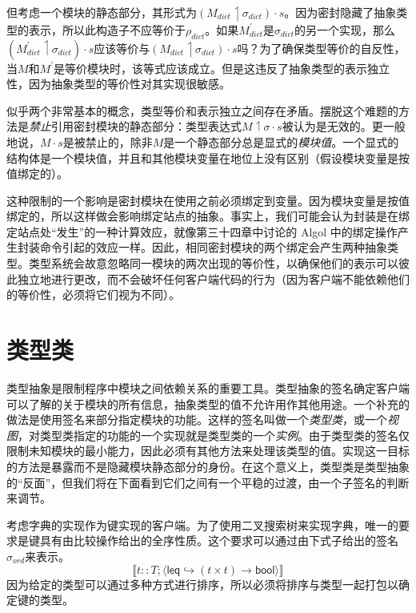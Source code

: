 但考虑一个模块的静态部分，其形式为$(M_{dict} \upharpoonleft \sigma_{dict}) \cdot s$。因为密封隐藏了抽象类型的表示，所以此构造子不应等价于$\rho_{dict}$。如果$M_{dict}^{\prime}$是$\sigma_{dict}$的另一个实现，那么$(M_{dict}^{\prime} \upharpoonleft \sigma_{dict}) \cdot s$应该等价与$(M_{dict} \upharpoonleft \sigma_{dict}) \cdot s$吗？为了确保类型等价的自反性，当$M$和$M^{\prime}$是等价模块时，该等式应该成立。但是这违反了抽象类型的表示独立性，因为抽象类型的等价性对其实现很敏感。

似乎两个非常基本的概念，类型等价和表示独立之间存在矛盾。摆脱这个难题的方法是\textit{禁止}引用密封模块的静态部分：类型表达式$M \upharpoonleft \sigma \cdot s$被认为是无效的。更一般地说，$M \cdot s$是被禁止的，除非$M$是一个静态部分总是显式的\textit{模块值}。一个显式的结构体是一个模块值，并且和其他模块变量在地位上没有区别（假设模块变量是按值绑定的）。

这种限制的一个影响是密封模块在使用之前必须绑定到变量。因为模块变量是按值绑定的，所以这样做会影响绑定站点的抽象。事实上，我们可能会认为封装是在绑定站点处“发生”的一种计算效应，就像第三十四章中讨论的 Algol 中的绑定操作产生封装命令引起的效应一样。因此，相同密封模块的两个绑定会产生两种抽象类型。类型系统会故意忽略同一模块的两次出现的等价性，以确保他们的表示可以彼此独立地进行更改，而不会破坏任何客户端代码的行为（因为客户端不能依赖他们的等价性，必须将它们视为不同）。

\section{类型类}

类型抽象是限制程序中模块之间依赖关系的重要工具。类型抽象的签名确定客户端可以了解的关于模块的所有信息，抽象类型的值不允许用作其他用途。一个补充的做法是使用签名来部分指定模块的功能。这样的签名叫做一个\textit{类型类}，或一个\textit{视图}，对类型类指定的功能的一个实现就是类型类的一个\textit{实例}。由于类型类的签名仅限制未知模块的最小能力，因此必须有其他方法来处理该类型的值。实现这一目标的方法是暴露而不是隐藏模块静态部分的身份。在这个意义上，类型类是类型抽象的“反面”，但我们将在下面看到它们之间有一个平稳的过渡，由一个子签名的判断来调节。


考虑字典的实现作为键实现的客户端。为了使用二叉搜索树来实现字典，唯一的要求是键具有由比较操作给出的全序性质。这个要求可以通过由下式子给出的签名$\sigma_{ord}$来表示。$$\llbracket t::T;\langle \mathsf{leq} \hookrightarrow (t \times t) \rightarrow \mathsf{bool} \rangle \rrbracket$$因为给定的类型可以通过多种方式进行排序，所以必须将排序与类型一起打包以确定键的类型。

